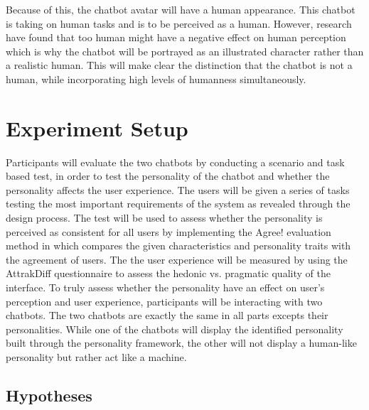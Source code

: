         Because of this, the chatbot avatar will have a human appearance. This chatbot is taking on human tasks and is to be perceived as a human. However, research have found that too human might have a negative effect on human perception which is why the chatbot will be portrayed as an illustrated character rather than a realistic human. This will make clear the distinction that the chatbot is not a human, while incorporating high levels of humanness simultaneously. 

\vspace{5mm} %
    
\section{Experiment Setup}
    
Participants will evaluate the two chatbots by conducting a scenario and task based test, in order to test the personality of the chatbot and whether the personality affects the user experience. The users will be given a series of tasks testing the most important requirements of the system as revealed through the design process. The test will be used to assess whether the personality is perceived as consistent for all users by implementing the Agree! evaluation method in which compares the given characteristics and personality traits with the agreement of users. The the user experience will be measured by using the AttrakDiff questionnaire to assess the hedonic vs. pragmatic quality of the interface. To truly assess whether the personality have an effect on user's perception and user experience, participants will be interacting with two chatbots. The two chatbots are exactly the same in all parts excepts their personalities. While one of the chatbots will display the identified personality built through the personality framework, the other will not display a human-like personality but rather act like a machine. %
    
\vspace{5mm} %

    \subsection{Hypotheses}
 
